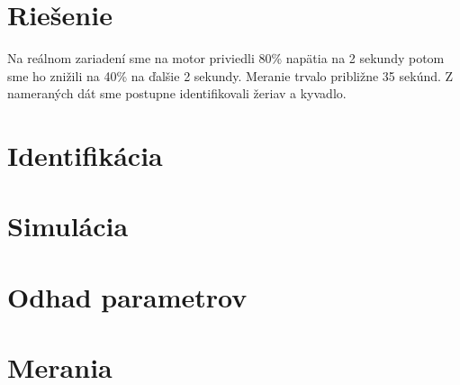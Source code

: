 \section{Riešenie}
Na reálnom zariadení sme na motor priviedli 80\% napätia na 2 sekundy potom sme ho znižili na 40\% na ďalšie 2 sekundy. Meranie trvalo približne 35 sekúnd. Z nameraných dát sme postupne identifikovali žeriav a kyvadlo.
\section{Identifikácia}
\section{Simulácia}
\section{Odhad parametrov}
\section{Merania}
